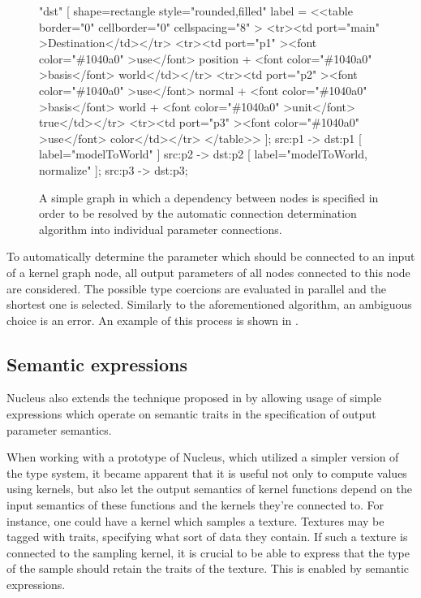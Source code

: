 \begin{figure}[ht!]
{{    		"dst" [
    			shape=rectangle style="rounded,filled"
    			label = <<table border="0" cellborder="0" cellspacing="8" >
    			<tr><td port="main" >Destination</td></tr>
    			<tr><td port="p1" ><font color="\#1040a0" >use</font> position + <font color="\#1040a0" >basis</font> world</td></tr>
    			<tr><td port="p2" ><font color="\#1040a0" >use</font> normal + <font color="\#1040a0" >basis</font> world + <font color="\#1040a0" >unit</font> true</td></tr>
    			<tr><td port="p3" ><font color="\#1040a0" >use</font> color</td></tr>
    			</table>>
    		];
    		src:p1 -> dst:p1 [ label="modelToWorld" ]
    		src:p2 -> dst:p2 [ label="modelToWorld, normalize" ];
    		src:p3 -> dst:p3;
	}}
  \caption[Automatic connection determination example]{A simple graph in which a dependency between nodes is specified in order to be resolved by the automatic connection determination algorithm into individual parameter connections.}
  \label{fig:AutoSemanticGraph}
\end{figure}

To automatically determine the parameter which should be connected to an input of a kernel graph node, all output parameters of all nodes connected to this node are considered. The possible type coercions are evaluated in parallel and the shortest one is selected. Similarly to the aforementioned algorithm, an ambiguous choice is an error. An example of this process is shown in .

\subsection{Semantic expressions}
\label{sec:SemanticExpressions}

Nucleus also extends the technique proposed in \cite{mcguire2006shadetrees} by allowing usage of simple expressions which operate on semantic traits in the specification of output parameter semantics.

When working with a prototype of Nucleus, which utilized a simpler version of the type system, it became apparent that it is useful not only to compute values using kernels, but also let the output semantics of kernel functions depend on the input semantics of these functions and the kernels they're connected to. For instance, one could have a kernel which samples a texture. Textures may be tagged with traits, specifying what sort of data they contain. If such a texture is connected to the sampling kernel, it is crucial to be able to express that the type of the sample should retain the traits of the texture. This is enabled by semantic expressions.

